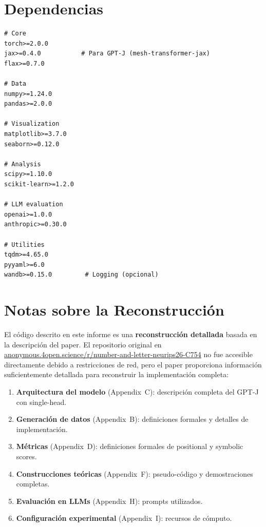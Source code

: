 \documentclass[12pt,a4paper]{report}
\begin{document}
\section{Dependencias}
\label{sec:dependencias}

\begin{lstlisting}
# Core
torch>=2.0.0
jax>=0.4.0           # Para GPT-J (mesh-transformer-jax)
flax>=0.7.0

# Data
numpy>=1.24.0
pandas>=2.0.0

# Visualization
matplotlib>=3.7.0
seaborn>=0.12.0

# Analysis
scipy>=1.10.0
scikit-learn>=1.2.0

# LLM evaluation
openai>=1.0.0
anthropic>=0.30.0

# Utilities
tqdm>=4.65.0
pyyaml>=6.0
wandb>=0.15.0         # Logging (opcional)
\end{lstlisting}

\section{Notas sobre la Reconstrucción}
\label{sec:notas}

El código descrito en este informe es una \textbf{reconstrucción detallada} basada en la descripción del paper. El repositorio original en \url{anonymous.4open.science/r/number-and-letter-neurips26-C754} no fue accesible directamente debido a restricciones de red, pero el paper proporciona información suficientemente detallada para reconstruir la implementación completa:

\begin{enumerate}
  \item \textbf{Arquitectura del modelo} (Appendix~C): descripción completa del GPT-J con single-head.
  \item \textbf{Generación de datos} (Appendix~B): definiciones formales y detalles de implementación.
  \item \textbf{Métricas} (Appendix~D): definiciones formales de positional y symbolic scores.
  \item \textbf{Construcciones teóricas} (Appendix~F): pseudo-código y demostraciones completas.
  \item \textbf{Evaluación en LLMs} (Appendix~H): prompts utilizados.
  \item \textbf{Configuración experimental} (Appendix~I): recursos de cómputo.
\end{enumerate}
\end{document}
